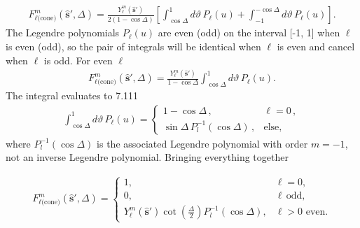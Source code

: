 \documentclass[]{osa-article}
\providecommand{\mh}[1]{\mathbf{\hat{#1}}}
\begin{document}
\begin{align}
    F_{\ell\text{(cone)}}^m(\mh{s}', \Delta) = \frac{Y_\ell^m(\mh{s}')}{2(1 - \cos\Delta)}\left[\int_{\cos\Delta}^1 d\vartheta\, P_\ell(u) + \int_{-1}^{-\cos\Delta} d\vartheta\, P_\ell(u)\right]. 
\end{align}
The Legendre polynomials $P_\ell(u)$ are even (odd) on the interval [-1, 1] when
$\ell$ is even (odd), so the pair of integrals will be identical when $\ell$ is
even and cancel when $\ell$ is odd. For even $\ell$
\begin{align}
  F_{\ell\text{(cone)}}^m(\mh{s}', \Delta) = \frac{Y_\ell^m(\mh{s}')}{1 - \cos\Delta}\int_{\cos\Delta}^1 d\vartheta\, P_\ell(u).
\end{align}
The integral evaluates to \cite{gradshteyn2007} 7.111 
\begin{align}
  \int_{\cos\Delta}^1 d\vartheta\, P_\ell(u) =
\begin{cases}
  1 - \cos\Delta\,, &\ell = 0\,,\\
  \sin\Delta\, P_l^{-1}(\cos\Delta)\,, &\text{else},
\end{cases}
\end{align}
where $P_l^{-1}(\cos\Delta)$ is the associated Legendre polynomial with order
$m=-1$, not an inverse Legendre polynomial. Bringing everything together

\begin{align}
  F_{\ell\text{(cone)}}^m(\mh{s}', \Delta) =
  \begin{cases}
    1, & \ell = 0,\\
    0, & \ell\, \text{odd},\\
    Y_\ell^m(\mh{s}')\cot\left(\frac{\Delta}{2}\right)P_l^{-1}(\cos\Delta), & \ell > 0\,\, \text{even}.
  \end{cases}
\end{align}
\end{document}
